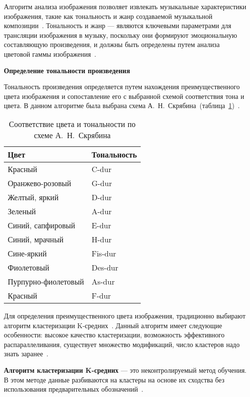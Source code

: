 Алгоритм анализа изображения позволяет извлекать музыкальные характеристики изображения, такие как тональность и жанр создаваемой музыкальной композиции~\cite{alg}.
Тональность и жанр --- являются ключевыми параметрами для трансляции изображения в музыку, поскольку они формируют эмоциональную составляющую произведения, и должны быть определены путем анализа цветовой гаммы изображения~\cite{actuality}.

\textbf{Определение тональности произведения}

Тональность произведения определяется путем нахождения преимущественного цвета изображения и сопоставление его с выбранной схемой соответствия тона и цвета.
В данном алгоритме была выбрана схема А.~Н.~Скрябина~(таблица~\ref{tab:color})~\cite{automatic_sound_generation, colortonote}.

\begin{table}[h]
	\centering
	\caption{Соответствие цвета и тональности по схеме А.~Н.~Скрябина}
	\label{tab:color}

	\begin{tabular}{|l|l|}
		\hline
		\textbf{Цвет} & \textbf{Тональность} \\
		\hline
		Красный & C-dur \\
		\hline
		Оранжево-розовый & G-dur \\
		\hline
		Желтый, яркий & D-dur \\
		\hline
		Зеленый & A-dur \\
		\hline
		Синий, сапфировый & E-dur \\
		\hline
		Синий, мрачный & H-dur \\
		\hline
		Сине-яркий & Fis-dur \\
		\hline
		Фиолетовый & Des-dur \\
		\hline
		Пурпурно-фиолетовый & As-dur \\
		\hline
		Красный & F-dur \\
		\hline
	\end{tabular}
\end{table}




Для определения преимущественного цвета изображения, традиционно выбирают алгоритм кластеризации K-средних~\cite{alg, web}.
Данный алгоритм имеет следующие особенности: высокое качество кластеризации, возможность эффективного распараллеливания, существует множество модификаций, число кластеров надо знать заранее~\cite{clustering, tyurin_cluster_analysis}. 

\textbf{Алгоритм кластеризации K-средних} --- это неконтролируемый метод обучения.
В этом методе данные разбиваются на кластеры на основе их сходства без использования предварительных обозначений~\cite{alg}.


